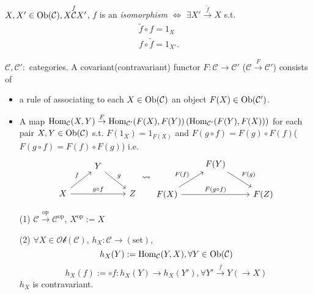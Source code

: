 \begin{definition}
  $X,X'\in \operatorname{Ob}(\mathcal{C}),X\overset{f}{\mathcal{C}}X'$, $f$ is an \textit{isomorphism} $\Leftrightarrow$ $\exists X'\overset{\widetilde{f}}{\to}X$ s.t. 
  \begin{align*}
    \widetilde{f}\circ f=1_{X}\\
    f\circ \widetilde{f}=1_{X'}
  .\end{align*}
\end{definition}
\begin{definition}[Functors]
     $\mathcal{C},\mathcal{C}':$ categories.
      A covariant(contravariant) functor $F:\mathcal{C}\to\mathcal{C}'$ ($\mathcal{C}\overset{F}{\to}\mathcal{C}'$) consists of 
      \begin{itemize}
	\item a rule of associating to each $X\in \operatorname{Ob}(\mathcal{C})$ an object $F(X)\in \operatorname{Ob}(\mathcal{C}')$.
	\item A map $\operatorname{Hom}_{\mathcal{C}}(X,Y)\overset{F}{\to} \operatorname{Hom}_{\mathcal{C}'}(F(X),F(Y))\left( \operatorname{Hom}_{\mathcal{C}'}(F(Y),F(X)) \right) $ for each pair $X,Y\in \operatorname{Ob}(\mathcal{C})$ s.t. $F(1_X)=1_{F(X)}$ and $F(g\circ f)=F(g)\circ F(f)$($F(g\circ f)=F(f)\circ F(g)$) i.e. 
	   \[
	  \begin{tikzcd}
	    & Y\arrow{rd}{g} & \\
	    X\arrow{ru}{f} \arrow{rr}{g\circ f}& & Z
	  \end{tikzcd} \rightsquigarrow 
	  \begin{tikzcd}
	    & F(Y)\arrow{rd}{F(g)} & \\
	    F(X)\arrow{ru}{F(f)} \arrow{rr}{F(g\circ f)}& & F(Z)
	  \end{tikzcd} 
	  \] 
      \end{itemize}
\end{definition}
\begin{example}
  \begin{enumerate}
    \item []
    \item [(1)] $\mathcal{C}\overset{\text{op}}{\to}\mathcal{C}^{\text{op}}$, $X^{\text{op}}:=X$
    \item [(2)] $\forall X\in \mathcal{Ob}(\mathcal{C})$, $h_X:\mathcal{C}\to (\text{set})$, 
      \[
	h_X(Y):=\operatorname{Hom}_{\mathcal{C}}(Y,X),\forall Y\in \operatorname{Ob}(\mathcal{C})
      \] 
      \[
	h_X(f):=\circ f:h_X(Y)\to h_X(Y'),\forall Y'\overset{f}{\to}Y(\to X)
      \] $h_X$ is contravariant. 
  \end{enumerate}
\end{example}

